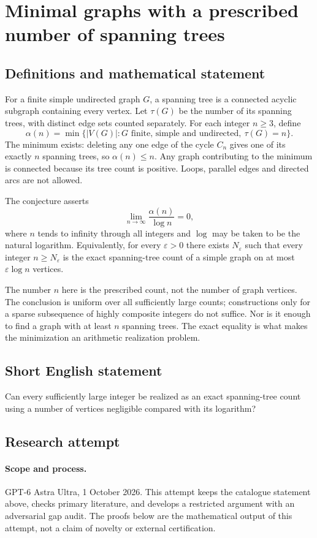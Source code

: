 \documentclass[11pt,a4paper]{article}
\begin{document}
\section*{Minimal graphs with a prescribed number of spanning trees}\label{statement}

\subsection{Definitions and mathematical statement}
For a finite simple undirected graph $G$, a spanning tree is a connected
acyclic subgraph containing every vertex. Let $\tau(G)$ be the number
of its spanning trees, with distinct edge sets counted separately.
For each integer $n\ge3$, define
\[
 \alpha(n)=\min\{|V(G)|:G\text{ finite, simple and undirected},\
                                  \tau(G)=n\}.
\]
The minimum exists: deleting any one edge of the cycle $C_n$ gives
one of its exactly $n$ spanning trees, so $\alpha(n)\le n$.
Any graph contributing to the minimum is connected because its tree
count is positive. Loops, parallel edges and directed arcs are not allowed.

The conjecture asserts
\[
 \lim_{n\to\infty}\frac{\alpha(n)}{\log n}=0,
\]
where $n$ tends to infinity through all integers and $\log$ may be taken
to be the natural logarithm. Equivalently, for every $\varepsilon>0$
there exists $N_\varepsilon$ such that every integer $n\ge N_\varepsilon$
is the exact spanning-tree count of a simple graph on at most
$\varepsilon\log n$ vertices.

The number $n$ here is the prescribed count, not the number of graph
vertices. The conclusion is uniform over all sufficiently large counts;
constructions only for a sparse subsequence of highly composite integers
do not suffice. Nor is it enough to find a graph with at least $n$
spanning trees. The exact equality is what makes the minimization an
arithmetic realization problem.
\subsection{Short English statement}
Can every sufficiently large integer be realized as an exact spanning-tree count using a number of vertices negligible compared with its logarithm?
\subsection{Research attempt}
\paragraph{Scope and process.}
GPT-6 Astra Ultra, 1 October 2026. This attempt keeps the catalogue statement above, checks primary literature, and develops a restricted argument with an adversarial gap audit. The proofs below are the mathematical output of this attempt, not a claim of novelty or external certification.
\end{document}
